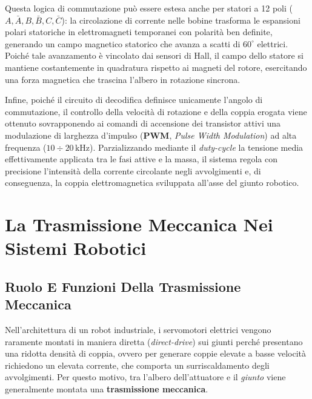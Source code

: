 ﻿\documentclass[11pt, a4paper]{article}
\begin{document}
Questa logica di commutazione può essere estesa anche per statori a 12 poli ($A, \bar{A}, B, \bar{B}, C, \bar{C}$): la circolazione di corrente nelle bobine trasforma le espansioni polari statoriche in elettromagneti temporanei con polarità ben definite, generando un campo magnetico statorico che avanza a scatti di $60^\circ$ elettrici. Poiché tale avanzamento è vincolato dai sensori di Hall, il campo dello statore si mantiene costantemente in quadratura rispetto ai magneti del rotore, esercitando una forza magnetica che trascina l'albero in rotazione sincrona.

Infine, poiché il circuito di decodifica definisce unicamente l'angolo di commutazione, il controllo della velocità di rotazione e della coppia erogata viene ottenuto sovrapponendo ai comandi di accensione dei transistor attivi una modulazione di larghezza d'impulso (\textbf{PWM}, \textit{Pulse Width Modulation}) ad alta frequenza ($10 \div 20\,\si{\kilo\hertz}$). Parzializzando mediante il \textit{duty-cycle} la tensione media effettivamente applicata tra le fasi attive e la massa, il sistema regola con precisione l'intensità della corrente circolante negli avvolgimenti e, di conseguenza, la coppia elettromagnetica sviluppata all'asse del giunto robotico.

\newpage

\section{La Trasmissione Meccanica Nei Sistemi Robotici}

\subsection{Ruolo E Funzioni Della Trasmissione Meccanica}
Nell'architettura di un robot industriale, i servomotori elettrici vengono raramente montati in maniera diretta (\textit{direct-drive}) sui giunti perché presentano una ridotta densità di coppia, ovvero per generare coppie elevate a basse velocità richiedono un elevata corrente, che comporta un surriscaldamento degli avvolgimenti. Per questo motivo, tra l'albero dell'attuatore e il \textit{giunto} viene generalmente montata una \textbf{trasmissione meccanica}.
\end{document}
